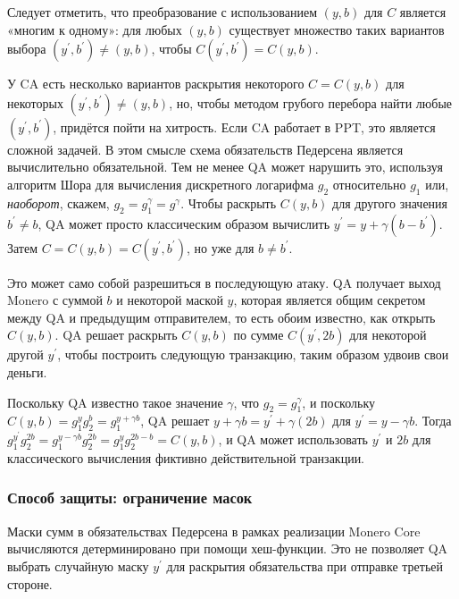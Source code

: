 \documentclass{mrl}
\begin{document}
Следует отметить, что преобразование с использованием $(y,b)$ для $C$ является «многим к одному»: для любых $(y, b)$ существует множество таких вариантов выбора $(y^\prime, b^\prime) \neq (y, b)$, чтобы $C(y^\prime, b^\prime) = C(y, b)$. 

У CA есть несколько вариантов раскрытия некоторого $C = C(y, b)$ для некоторых $(y^\prime, b^\prime) \neq (y, b)$, но, чтобы методом грубого перебора найти любые $(y^\prime, b^\prime)$, придётся пойти на хитрость. Если CA работает в PPT, это является сложной задачей. В этом смысле схема обязательств Педерсена является вычислительно обязательной. Тем не менее QA может нарушить это, используя алгоритм Шора для вычисления дискретного логарифма $g_2$ относительно $g_1$ или, \textit{наоборот}, скажем, $g_2 = g_1^{\gamma} = g^\gamma$. Чтобы раскрыть $C(y, b)$ для другого значения $b^\prime \neq b$, QA может просто классическим образом вычислить $y^\prime = y + \gamma (b - b^\prime)$. Затем $C = C(y, b) = C(y^\prime, b^\prime)$, но уже для $b \neq b^\prime$. 

Это может само собой разрешиться в последующую атаку. QA получает выход Monero с суммой $b$ и некоторой маской $y$, которая является общим секретом между QA и предыдущим отправителем, то есть обоим известно, как открыть $C(y,b)$. QA решает раскрыть $C(y, b)$ по сумме $C(y^\prime, 2b)$ для некоторой другой $y^\prime$, чтобы построить следующую транзакцию, таким образом удвоив свои деньги.

Поскольку QA известно такое значение $\gamma$, что $g_2 = g_1^\gamma$, и поскольку $C(y, b) = g_1^y g_2^b = g_1^{y + \gamma b}$, QA решает $y + \gamma b = y^\prime + \gamma (2b)$ для $y^\prime = y - \gamma b$. Тогда $g_1^{y^\prime} g_2^{2b} = g_1^{y - \gamma b}g_2^{2b} = g_1^y g_2^{2b - b} = C(y, b)$, и QA может использовать $y^\prime$ и $2b$ для классического вычисления фиктивно действительной транзакции.

\subsubsection{Способ защиты: ограничение масок}\label{blinder}

Маски сумм в обязательствах Педерсена в рамках реализации Monero Core вычисляются детерминировано при помощи хеш-функции. Это не позволяет QA выбрать случайную маску $y^\prime$ для раскрытия обязательства при отправке третьей стороне.
\end{document}
